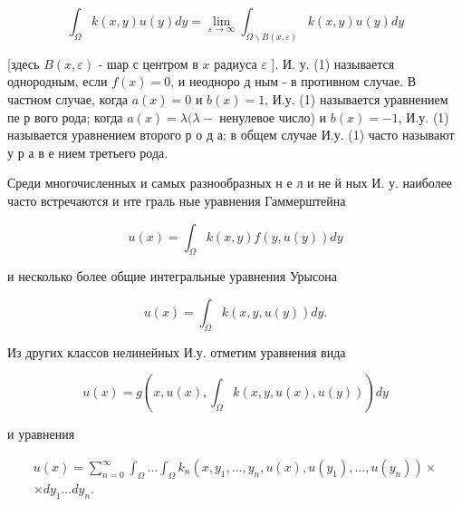 \documentclass[10pt]{article}
\begin{document}
\[

\int_{\Omega} k(x, y) u(y) d y=\lim _{\varepsilon \rightarrow \infty} \int_{\Omega \backslash B(x, \varepsilon)} k(x, y) u(y) d y

\]



[здесь $B(x, \varepsilon)$ - шар с центром в $x$ радиуса $\varepsilon$ ]. И. у. (1) называется однородным, если $f(x)=0$, и неодноро д ным - в противном случае. В частном случае, когда $a(x)=0$ и $b(x)=1$, И.у. (1) называется уравнением пе р вого рода; когда $a(x)=\lambda(\lambda-$ ненулевое число) и $b(x)=-1$, И.у. (1) называется уравнением второго р о д а; в общем случае И.у. (1) часто называют у р а в е нием третьего рода.



Среди многочисленных и самых разнообразных н е л и не й ных И. у. наиболее часто встречаются и нте граль ные уравнения Гаммерштейна



\[

u(x)=\int_{\Omega} k(x, y) f(y, u(y)) d y

\]



и несколько более общие интегральные уравнения Урысона



\[

u(x)=\int_{\Omega} k(x, y, u(y)) d y .

\]



Из других классов нелинейных И.у. отметим уравнения вида



\[

u(x)=g\left(x, u(x), \int_{\Omega} k(x, y, u(x), u(y))\right) d y

\]



и уравнения



\[

\begin{gathered}

u(x)=\sum_{n=0}^{\infty} \int_{\Omega} \ldots \int_{\Omega} k_{n}\left(x, y_{1}, \ldots, y_{n}, u(x), u\left(y_{1}\right), \ldots, u\left(y_{n}\right)\right) \times \\

\times d y_{1} \ldots d y_{n} .

\end{gathered}

\]
\end{document}
